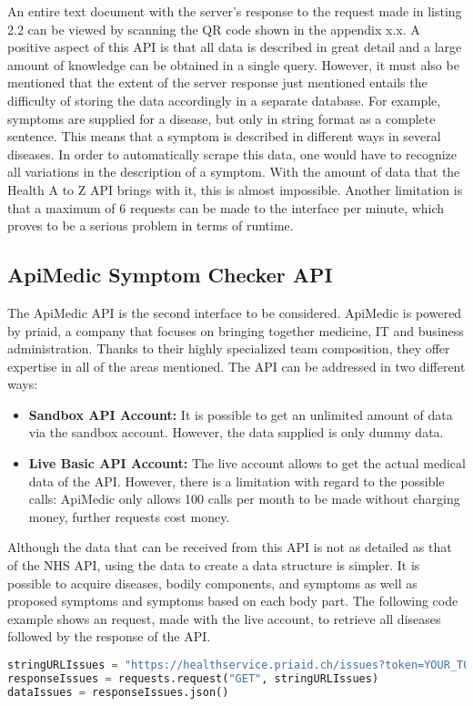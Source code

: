 An entire text document with the server's response to the request made in listing 2.2 can be viewed by scanning the QR code shown in the appendix x.x. A positive aspect of this API is that all data is described in great detail and a large amount of knowledge can be obtained in a single query. However, it must also be mentioned that the extent of the server response just mentioned entails the difficulty of storing the data accordingly in a separate database. For example, symptoms are supplied for a disease, but only in string format as a complete sentence. This means that a symptom is described in different ways in several diseases. In order to automatically scrape this data, one would have to recognize all variations in the description of a symptom. With the amount of data that the Health A to Z API brings with it, this is almost impossible. Another limitation is that a maximum of 6 requests can be made to the interface per minute, which proves to be a serious problem in terms of runtime.

\subsection{ApiMedic Symptom Checker API}
The ApiMedic API is the second interface to be considered. ApiMedic is powered by priaid, a company that focuses on bringing together medicine, IT and business administration. Thanks to their highly specialized team composition, they offer expertise in all of the areas mentioned. The API can be addressed in two different ways:
\begin{itemize}
	\item \textbf{Sandbox API Account:}
	It is possible to get an unlimited amount of data via the sandbox account. However, the data supplied is only dummy data.
	\item \textbf{Live Basic API Account:}
	The live account allows to get the actual medical data of the API. However, there is a limitation with regard to the possible calls: ApiMedic only allows 100 calls per month to be made without charging money, further requests cost money.
\end{itemize}
Although the data that can be received from this API is not as detailed as that of the NHS API, using the data to create a data structure is simpler. It is possible to acquire diseases, bodily components, and symptoms as well as proposed symptoms and symptoms based on each body part. The following code example shows an request, made with the live account, to retrieve all diseases followed by the response of the API.
\begin{lstlisting}[language=Python, caption={Example Python Request for the ApiMedic API (all issues)}]
stringURLIssues = "https://healthservice.priaid.ch/issues?token=YOUR_TOKEN"
responseIssues = requests.request("GET", stringURLIssues)
dataIssues = responseIssues.json()
\end{lstlisting}

